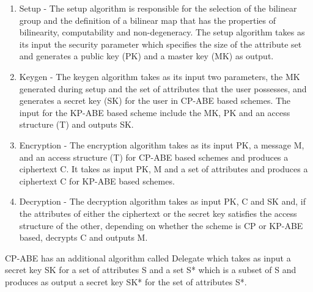 \begin{enumerate}
	
	\item Setup -  The setup algorithm is responsible for the selection of the bilinear group and the definition of a bilinear map that has the properties of bilinearity, computability and non-degeneracy. The setup algorithm takes as its input the security parameter which specifies the size of the attribute set and generates a public key (PK) and a master key (MK) as output.
	
	\item Keygen - The keygen algorithm takes as its input two parameters, the MK generated during setup and the set of attributes that the user possesses, and generates a secret key (SK) for the user in CP-ABE based schemes. The input for the KP-ABE based scheme include the MK, PK and an access structure (T) and outputs SK.
	
	\item Encryption - The encryption algorithm takes as its input PK, a message M, and an access structure (T) for CP-ABE based schemes and produces a ciphertext C. It takes as input PK, M and a set of attributes and produces a ciphertext C for KP-ABE based schemes.
	
	\item Decryption - The decryption algorithm takes as input PK, C and SK and, if the attributes of either the ciphertext or the secret key satisfies the access structure of the other, depending on whether the scheme is CP or KP-ABE based, decrypts C and outputs M.
	
\end{enumerate}

CP-ABE has an additional algorithm called Delegate which takes as input a secret key SK for a set of attributes S and a set S* which is a subset of S and produces as output a secret key SK* for the set of attributes S*.
